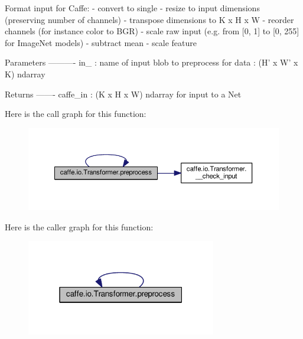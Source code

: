 \begin{DoxyVerb}Format input for Caffe:
- convert to single
- resize to input dimensions (preserving number of channels)
- transpose dimensions to K x H x W
- reorder channels (for instance color to BGR)
- scale raw input (e.g. from [0, 1] to [0, 255] for ImageNet models)
- subtract mean
- scale feature

Parameters
----------
in_ : name of input blob to preprocess for
data : (H' x W' x K) ndarray

Returns
-------
caffe_in : (K x H x W) ndarray for input to a Net
\end{DoxyVerb}
 Here is the call graph for this function\+:
\nopagebreak
\begin{figure}[H]
\begin{center}
\leavevmode
\includegraphics[width=350pt]{classcaffe_1_1io_1_1_transformer_a0b2d73743d661b36853fe3d963bd5fbb_cgraph}
\end{center}
\end{figure}
Here is the caller graph for this function\+:
\nopagebreak
\begin{figure}[H]
\begin{center}
\leavevmode
\includegraphics[width=235pt]{classcaffe_1_1io_1_1_transformer_a0b2d73743d661b36853fe3d963bd5fbb_icgraph}
\end{center}
\end{figure}
\mbox{\label{classcaffe_1_1io_1_1_transformer_a0b2d73743d661b36853fe3d963bd5fbb}} 
